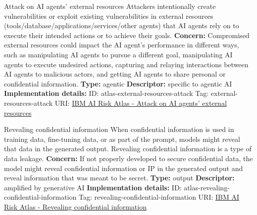 \documentclass[a4paper,12pt]{article}
\begin{document}
\begin{definitionbox}{Attack on AI agents’ external resources}
Attackers intentionally create vulnerabilities or exploit existing vulnerabilities in external resources (tools/database/applications/services/other agents) that AI agents rely on to execute their intended actions or to achieve their goals. \newline\newline
\textbf{Concern: }Compromised external resources could impact the AI agent's performance in different ways, such as manipulating AI agents to pursue a different goal, manipulating AI agents to execute undesired actions, capturing and relaying interactions between AI agents to malicious actors, and getting AI agents to share personal or confidential information.\newline\newline
\textbf{Type: }agentic\newline
\textbf{Descriptor: }specific to agentic AI \newline\newline
\textbf{Implementation details: } \newline
ID: atlas-external-resources-attack \newline
Tag: external-resources-attack \newline
URI:  \href{https://www.ibm.com/docs/en/watsonx/saas?topic=SSYOK8/wsj/ai-risk-atlas/external-resources-attack.html}{IBM AI Risk Atlas - Attack on AI agents’ external resources}\newline
\end{definitionbox}
\begin{definitionbox}{Revealing confidential information}
When confidential information is used in training data, fine-tuning data, or as part of the prompt, models might reveal that data in the generated output. Revealing confidential information is a type of data leakage.\newline\newline
\textbf{Concern: }If not properly developed to secure confidential data, the model might reveal confidential information or IP in the generated output and reveal information that was meant to be secret.\newline\newline
\textbf{Type: }output\newline
\textbf{Descriptor: }amplified by generative AI \newline\newline
\textbf{Implementation details: } \newline
ID: atlas-revealing-confidential-information \newline
Tag: revealing-confidential-information \newline
URI:  \href{https://www.ibm.com/docs/en/watsonx/saas?topic=SSYOK8/wsj/ai-risk-atlas/revealing-confidential-information.html}{IBM AI Risk Atlas - Revealing confidential information}\newline
\end{definitionbox}
\end{document}
